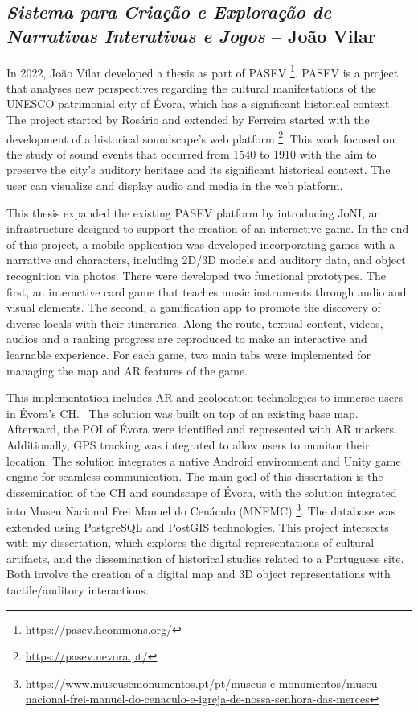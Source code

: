 \subsection{\textit{Sistema para Criação e Exploração de Narrativas Interativas e Jogos} – João Vilar}
\label{sec:thesis1_nova}


In 2022, João Vilar developed a thesis as part of \gls{PASEV} \footnote{\url{https://pasev.hcommons.org/}}. \gls{PASEV} is a project that analyses new perspectives regarding the cultural manifestations of the UNESCO patrimonial city of Évora,
which has a significant historical context. The project started by Rosário and extended by Ferreira started with the development of a historical soundscape's web platform \footnote{\url{https://pasev.uevora.pt/}}. 
This work focused on the study of sound events that occurred from 1540 to 1910 with the aim to preserve the city's auditory heritage and its significant historical context. The user can
visualize and display audio and media in the web platform. ~\cite{rodrigues2021using}

  
This thesis expanded the existing \gls{PASEV} platform by introducing JoNI, an infrastructure designed to support the creation of an interactive game. In the end of this project, a mobile 
application was developed incorporating games with a narrative and characters, including \gls{2D}/\gls{3D} models and auditory data, and object recognition via photos. There were developed two 
functional prototypes. The first, an interactive card game that teaches music instruments through audio and visual elements. The second, a gamification app to promote the discovery 
of diverse locals with their itineraries.  Along the route, textual content, videos, audios and a ranking progress are reproduced to make an interactive and learnable experience. 
For each game, two main tabs were implemented for managing the map and \gls{AR} features of the game. ~\cite{tese_jogosVilar2022}

This implementation includes \gls{AR} and geolocation technologies to immerse users in Évora's \gls{CH}.~\cite{vilar2024extended}
The solution was built on top of an existing base map. Afterward, the \gls{POI} of Évora were identified and represented with \gls{AR} markers. Additionally, GPS tracking was
  integrated to allow users to monitor their location.
The solution integrates a native Android environment and Unity game engine for seamless communication. The main goal of this dissertation is the dissemination of the \gls{CH} 
and soundscape of Évora, with the solution integrated into Museu Nacional Frei Manuel do Cenáculo (MNFMC) \footnote{\url{https://www.museusemonumentos.pt/pt/museus-e-monumentos/museu-nacional-frei-manuel-do-cenaculo-e-igreja-de-nossa-senhora-das-merces}}. 
The database was extended using PostgreSQL and PostGIS technologies.
This project intersects with my dissertation, which explores the digital representations of cultural artifacts, and the dissemination of historical studies related to a Portuguese site. 
Both involve the creation of a digital map and \gls{3D} object representations with tactile/auditory interactions.

